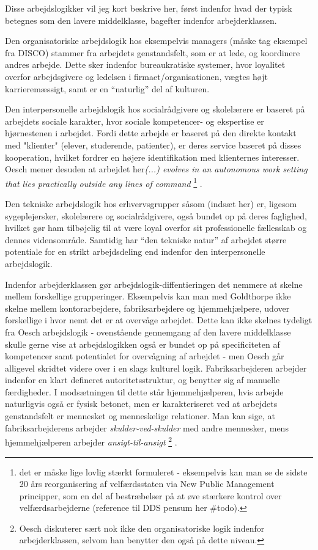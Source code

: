 
Disse arbejdslogikker vil jeg kort beskrive her, først indenfor hvad der typisk betegnes som den lavere middelklasse, bagefter indenfor arbejderklassen.

Den organisatoriske arbejdslogik hos eksempelvis managers (måske tag eksempel fra DISCO) stammer fra arbejdets genstandsfelt, som er at lede, og koordinere andres arbejde. Dette sker indenfor bureaukratiske systemer, hvor loyalitet overfor arbejdsgivere og ledelsen i firmaet/organisationen, vægtes højt karrieremæssigt, samt er en “naturlig” del af kulturen. 

Den interpersonelle arbejdslogik hos socialrådgivere og skolelærere er baseret på arbejdets sociale karakter, hvor sociale kompetencer- og ekspertise er hjørnestenen i arbejdet. Fordi dette arbejde er baseret på den direkte kontakt med "klienter" (elever, studerende, patienter), er deres service baseret på disses kooperation, hvilket fordrer en højere identifikation med klienternes interesser. Oesch mener desuden at arbejdet her\emph{(...) evolves in an autonomous work setting that lies practically outside any lines of command} \parencite[65]{Oesch2006a}%
%
\footnote{ det er måske lige lovlig stærkt formuleret - eksempelvis kan man se de sidste 20 års reorganisering af velfærdsstaten via New Public Management principper, som en del af bestræbelser på at øve stærkere kontrol over velfærdsarbejderne (reference til DDS pensum her \#todo).}%
%
. 

Den tekniske arbejdslogik hos erhvervsgrupper såsom (indsæt her) er, ligesom sygeplejersker, skolelærere og socialrådgivere, også bundet op på deres faglighed, hvilket gør ham tilbøjelig til at være loyal overfor sit professionelle fællesskab og dennes vidensområde. Samtidig har “den tekniske natur” af arbejdet større potentiale for en strikt arbejdsdeling end indenfor den interpersonelle arbejdslogik. 

Indenfor arbejderklassen gør arbejdslogik-diffentieringen det nemmere at skelne mellem forskellige grupperinger. Eksempelvis kan man med Goldthorpe ikke skelne mellem kontorarbejdere, fabriksarbejdere og hjemmehjælpere, udover forskellige i hvor nemt det er at overvåge arbejdet. Dette kan ikke skelnes tydeligt fra Oesch arbejdslogik - ovenstående gennemgang af den lavere middelklasse skulle gerne vise at arbejdslogikken også er bundet op på specificiteten af kompetencer samt potentialet for overvågning af arbejdet - men Oesch går alligevel skridtet videre over i en slags kulturel logik. Fabriksarbejderen arbejder indenfor en klart defineret autoritetsstruktur, og benytter sig af manuelle færdigheder. I modsætningen til dette står hjemmehjælperen, hvis arbejde naturligvis også er fysisk betonet, men er karakteriseret ved at arbejdets genstandsfelt er mennesket og menneskelige relationer. Man kan sige, at fabriksarbejderens arbejder \emph{skulder-ved-skulder} med andre mennesker, mens hjemmehjælperen arbejder \emph{ansigt-til-ansigt}%
%
\footnote{ Oesch diskuterer sært nok ikke den organisatoriske logik indenfor arbejderklassen, selvom han benytter den også på dette niveau.}%
%
. 


